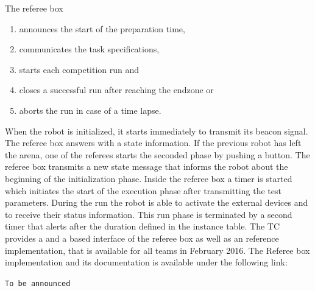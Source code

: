 The referee box
\begin{enumerate}
  \item announces the start of the preparation time,
  \item communicates the task specifications,
  \item starts each competition run and
  \item closes a successful run after reaching the endzone or
  \item aborts the run in case of a time lapse.
\end{enumerate}

When the robot is initialized, it starts immediately to transmit its beacon 
signal. The referee box answers with a state information. If the previous robot 
has left the arena, one of the referees starts the seconded phase by pushing a 
button. The referee box transmits a new state message that informs the robot 
about the beginning of the initialization phase. Inside the referee box a 
timer is started which initiates the start of the execution phase after 
transmitting the test parameters. During the run the robot is able to activate 
the external devices and to receive their status information. This run phase is 
terminated by a second timer that alerts after the duration defined in the 
instance table.
% 
% 
The TC provides a  and a  based interface of the referee box as well as 
an reference implementation, that is available for all teams in February 2016.
The Referee box implementation and its documentation is available under the following link:
\begin{center}
	\texttt{To be announced} %
\end{center}




